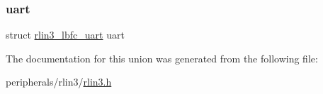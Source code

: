 \mbox{\label{unionrlin3__lbfc_aded53e20b3095d4feec0e4ed6378fd91}} 
\subsubsection{\texorpdfstring{uart}{uart}}
{\footnotesize\ttfamily struct \mbox{\hyperlink{structrlin3__lbfc__uart}{rlin3\+\_\+lbfc\+\_\+uart}} uart}



The documentation for this union was generated from the following file\+:\begin{DoxyCompactItemize}
\item 
peripherals/rlin3/\mbox{\hyperlink{rlin3_8h}{rlin3.\+h}}\end{DoxyCompactItemize}
